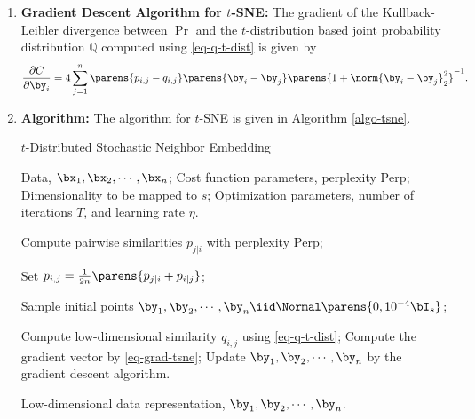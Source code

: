 \documentclass[12pt]{article}
\begin{document}
\begin{enumerate}[label=\textbf{\arabic*.}]
	\item \textbf{Gradient Descent Algorithm for $t$-SNE:} The gradient of the Kullback-Leibler divergence between $\Pr$ and the $t$-distribution based joint probability distribution $\mathbb{Q}$ computed using \eqref{eq-q-t-dist} is given by 
	\begin{align}\label{eq-grad-tsne}
		\frac{\partial C}{\partial \by_i} = 4 \sum_{j=1}^n \parens{p_{i,j} - q_{i,j}} \parens{\by_i - \by_j} \parens{1 + \norm{\by_i - \by_j}_2^2}^{-1}. 
	\end{align}
	
	\item \textbf{Algorithm:} The algorithm for $t$-SNE is given in Algorithm \ref{algo-tsne}. 
	
	\begin{minipage}{\linewidth}
		\begin{algorithm}[H]
			\caption{$t$-Distributed Stochastic Neighbor Embedding}\label{algo-tsne}
			\begin{algorithmic}[1]
				\REQUIRE Data, $\bx_1, \bx_2, \cdots, \bx_n$; 
				\REQUIRE Cost function parameters, perplexity $\mathrm{Perp}$; 
				\REQUIRE Dimensionality to be mapped to $s$; 
				\REQUIRE Optimization parameters, number of iterations $T$, and learning rate $\eta$. 
				
				\STATE Compute pairwise similarities $p_{j \vert i}$ with perplexity $\mathrm{Perp}$; 
				
				\STATE Set $p_{i,j} = \frac{1}{2n} \parens{p_{j \vert i} + p_{i \vert j}}$; 
				
				\STATE Sample initial points $\by_1, \by_2, \cdots, \by_n \iid \Normal \parens{0, 10^{-4} \bI_s}$; 
				
					\STATE Compute low-dimensional similarity $q_{i,j}$ using \eqref{eq-q-t-dist}; 
					\STATE Compute the gradient vector by \eqref{eq-grad-tsne}; 
					\STATE Update $\by_1, \by_2, \cdots, \by_n$ by the gradient descent algorithm. 
				\ENDFOR
				
				\RETURN Low-dimensional data representation, $\by_1, \by_2, \cdots, \by_n$. 
			\end{algorithmic}
		\end{algorithm}
	\end{minipage}
	

\end{enumerate}
\end{document}
